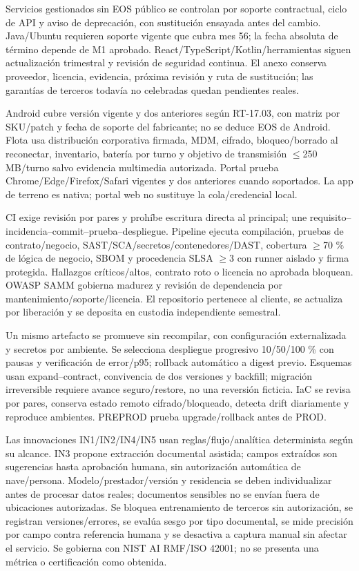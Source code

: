 \documentclass[11pt,letterpaper]{report}
\begin{document}
Servicios gestionados sin EOS público se controlan por soporte contractual, ciclo de API y aviso de deprecación, con sustitución ensayada antes del cambio. Java/Ubuntu requieren soporte vigente que cubra mes 56; la fecha absoluta de término depende de M1 aprobado. React/TypeScript/Kotlin/herramientas siguen actualización trimestral y revisión de seguridad continua. El anexo conserva proveedor, licencia, evidencia, próxima revisión y ruta de sustitución; las garantías de terceros todavía no celebradas quedan pendientes reales.

Android cubre versión vigente y dos anteriores según RT-17.03, con matriz por SKU/patch y fecha de soporte del fabricante; no se deduce EOS de Android. Flota usa distribución corporativa firmada, MDM, cifrado, bloqueo/borrado al reconectar, inventario, batería por turno y objetivo de transmisión $\leq$250 MB/turno salvo evidencia multimedia autorizada. Portal prueba Chrome/Edge/Firefox/Safari vigentes y dos anteriores cuando soportados. La app de terreno es nativa; portal web no sustituye la cola/credencial local.

CI exige revisión por pares y prohíbe escritura directa al principal; une requisito--incidencia--commit--prueba--despliegue. Pipeline ejecuta compilación, pruebas de contrato/negocio, SAST/SCA/secretos/contenedores/DAST, cobertura $\geq$70 \% de lógica de negocio, SBOM y procedencia SLSA $\geq$3 con runner aislado y firma protegida. Hallazgos críticos/altos, contrato roto o licencia no aprobada bloquean. OWASP SAMM gobierna madurez y revisión de dependencia por mantenimiento/soporte/licencia. El repositorio pertenece al cliente, se actualiza por liberación y se deposita en custodia independiente semestral.

Un mismo artefacto se promueve sin recompilar, con configuración externalizada y secretos por ambiente. Se selecciona despliegue progresivo 10/50/100 \% con pausas y verificación de error/p95; rollback automático a digest previo. Esquemas usan expand--contract, convivencia de dos versiones y backfill; migración irreversible requiere avance seguro/restore, no una reversión ficticia. IaC se revisa por pares, conserva estado remoto cifrado/bloqueado, detecta drift diariamente y reproduce ambientes. PREPROD prueba upgrade/rollback antes de PROD.

Las innovaciones IN1/IN2/IN4/IN5 usan reglas/flujo/analítica determinista según su alcance. IN3 propone extracción documental asistida; campos extraídos son sugerencias hasta aprobación humana, sin autorización automática de nave/persona. Modelo/prestador/versión y residencia se deben individualizar antes de procesar datos reales; documentos sensibles no se envían fuera de ubicaciones autorizadas. Se bloquea entrenamiento de terceros sin autorización, se registran versiones/errores, se evalúa sesgo por tipo documental, se mide precisión por campo contra referencia humana y se desactiva a captura manual sin afectar el servicio. Se gobierna con NIST AI RMF/ISO 42001; no se presenta una métrica o certificación como obtenida.
\end{document}
